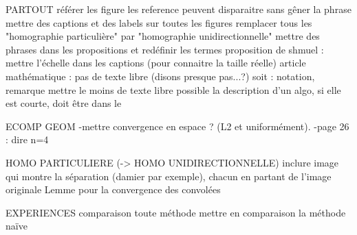 PARTOUT
	référer les figure
	les reference peuvent disparaitre sans gêner la phrase
	mettre des captions et des labels sur toutes les figures
	remplacer tous les "homographie particulière" par "homographie unidirectionnelle"
	mettre des phrases dans les propositions et redéfinir les termes
	proposition de shmuel : mettre l'échelle dans les captions (pour connaitre la taille réelle)
	article mathématique : pas de texte libre (disons presque pas...?)
		soit : notation, remarque
	mettre le moins de texte libre possible
	la description d'un algo, si elle est courte, doit être dans le \caption


DECOMP GEOM 
	-mettre convergence en espace ? (L2 et uniformément).
	-page 26 : dire n=4


HOMO PARTICULIERE (-> HOMO UNIDIRECTIONNELLE)
	inclure image qui montre la séparation (damier par exemple), chacun en partant de l'image originale
	Lemme pour la convergence des convolées



EXPERIENCES
	comparaison toute méthode
	mettre en comparaison la méthode naïve
